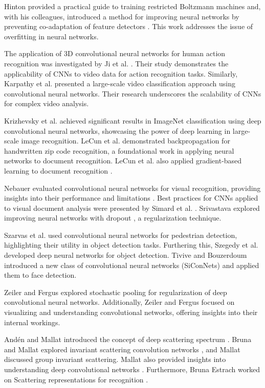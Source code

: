 \documentclass{article}
\begin{document}
Hinton provided a practical guide to training restricted Boltzmann machines \cite{7} and, with his colleagues, introduced a method for improving neural networks by preventing co-adaptation of feature detectors \cite{8}. This work addresses the issue of overfitting in neural networks.

The application of 3D convolutional neural networks for human action recognition was investigated by Ji et al. \cite{9}. Their study demonstrates the applicability of CNNs to video data for action recognition tasks. Similarly, Karpathy et al. \cite{10} presented a large-scale video classification approach using convolutional neural networks. Their research underscores the scalability of CNNs for complex video analysis.

Krizhevsky et al. \cite{11} achieved significant results in ImageNet classification using deep convolutional neural networks, showcasing the power of deep learning in large-scale image recognition. LeCun et al. \cite{12} demonstrated backpropagation for handwritten zip code recognition, a foundational work in applying neural networks to document recognition. LeCun et al. also applied gradient-based learning to document recognition \cite{13}.

Nebauer evaluated convolutional neural networks for visual recognition, providing insights into their performance and limitations \cite{14}. Best practices for CNNs applied to visual document analysis were presented by Simard et al. \cite{15}. Srivastava explored improving neural networks with dropout \cite{16}, a regularization technique.

Szarvas et al. \cite{17} used convolutional neural networks for pedestrian detection, highlighting their utility in object detection tasks. Furthering this, Szegedy et al. \cite{18} developed deep neural networks for object detection. Tivive and Bouzerdoum \cite{19} introduced a new class of convolutional neural networks (SiConNets) and applied them to face detection.

Zeiler and Fergus \cite{20} explored stochastic pooling for regularization of deep convolutional neural networks. Additionally, Zeiler and Fergus \cite{21} focused on visualizing and understanding convolutional networks, offering insights into their internal workings.

Andén and Mallat introduced the concept of deep scattering spectrum \cite{22}. Bruna and Mallat explored invariant scattering convolution networks \cite{23}, and Mallat \cite{28} discussed group invariant scattering. Mallat also provided insights into understanding deep convolutional networks \cite{29}. Furthermore, Bruna Estrach worked on Scattering representations for recognition \cite{25}.
\end{document}
